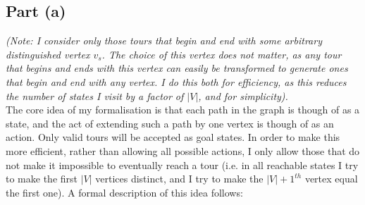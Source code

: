 \documentclass[a4paper,12pt]{scrartcl}
\begin{document}
\subsection*{Part (a)}
\textit{(Note: I consider only those tours that begin and end with some arbitrary distinguished vertex $v_s$. The choice of this vertex does not matter, as any tour that begins and ends with this vertex can easily be transformed to generate ones that begin and end with any vertex. I do this both for efficiency, as this reduces the number of states I visit by a factor of $|V|$, and for simplicity).} \\
The core idea of my formalisation is that each path in the graph is though of as a state, and the act of extending such a path by one vertex is though of as an action. Only valid tours will be accepted as goal states. In order to make this more efficient, rather than allowing all possible actions, I only allow those that do not make it impossible to eventually reach a tour (i.e. in all reachable states I try to make the first $|V|$ vertices distinct, and I try to make the $|V|+1^{th}$ vertex equal the first one). A formal description of this idea follows:
\end{document}
